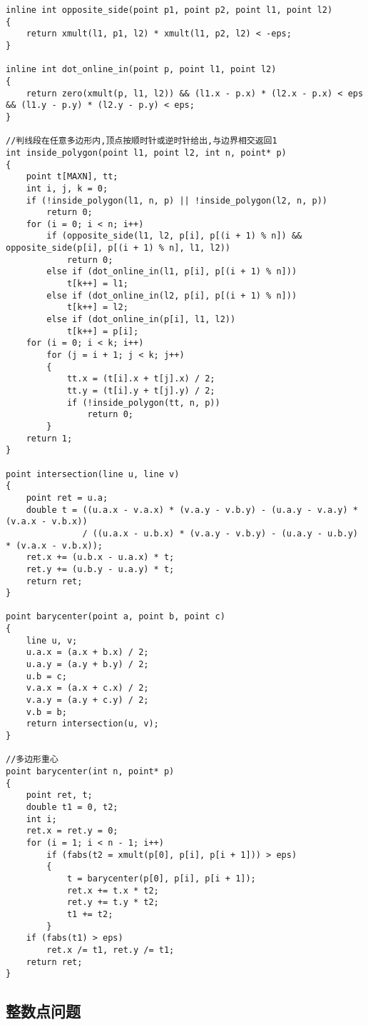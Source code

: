 \documentclass[a4]{article}
\begin{document}
\begin{lstlisting}
inline int opposite_side(point p1, point p2, point l1, point l2)
{
    return xmult(l1, p1, l2) * xmult(l1, p2, l2) < -eps;
}

inline int dot_online_in(point p, point l1, point l2)
{
    return zero(xmult(p, l1, l2)) && (l1.x - p.x) * (l2.x - p.x) < eps && (l1.y - p.y) * (l2.y - p.y) < eps;
}

//判线段在任意多边形内,顶点按顺时针或逆时针给出,与边界相交返回1
int inside_polygon(point l1, point l2, int n, point* p)
{
    point t[MAXN], tt;
    int i, j, k = 0;
    if (!inside_polygon(l1, n, p) || !inside_polygon(l2, n, p))
        return 0;
    for (i = 0; i < n; i++)
        if (opposite_side(l1, l2, p[i], p[(i + 1) % n]) && opposite_side(p[i], p[(i + 1) % n], l1, l2))
            return 0;
        else if (dot_online_in(l1, p[i], p[(i + 1) % n]))
            t[k++] = l1;
        else if (dot_online_in(l2, p[i], p[(i + 1) % n]))
            t[k++] = l2;
        else if (dot_online_in(p[i], l1, l2))
            t[k++] = p[i];
    for (i = 0; i < k; i++)
        for (j = i + 1; j < k; j++)
        {
            tt.x = (t[i].x + t[j].x) / 2;
            tt.y = (t[i].y + t[j].y) / 2;
            if (!inside_polygon(tt, n, p))
                return 0;
        }
    return 1;
}

point intersection(line u, line v)
{
    point ret = u.a;
    double t = ((u.a.x - v.a.x) * (v.a.y - v.b.y) - (u.a.y - v.a.y) * (v.a.x - v.b.x))
               / ((u.a.x - u.b.x) * (v.a.y - v.b.y) - (u.a.y - u.b.y) * (v.a.x - v.b.x));
    ret.x += (u.b.x - u.a.x) * t;
    ret.y += (u.b.y - u.a.y) * t;
    return ret;
}

point barycenter(point a, point b, point c)
{
    line u, v;
    u.a.x = (a.x + b.x) / 2;
    u.a.y = (a.y + b.y) / 2;
    u.b = c;
    v.a.x = (a.x + c.x) / 2;
    v.a.y = (a.y + c.y) / 2;
    v.b = b;
    return intersection(u, v);
}

//多边形重心
point barycenter(int n, point* p)
{
    point ret, t;
    double t1 = 0, t2;
    int i;
    ret.x = ret.y = 0;
    for (i = 1; i < n - 1; i++)
        if (fabs(t2 = xmult(p[0], p[i], p[i + 1])) > eps)
        {
            t = barycenter(p[0], p[i], p[i + 1]);
            ret.x += t.x * t2;
            ret.y += t.y * t2;
            t1 += t2;
        }
    if (fabs(t1) > eps)
        ret.x /= t1, ret.y /= t1;
    return ret;
}
\end{lstlisting}
\subsection{整数点问题}
\end{document}

